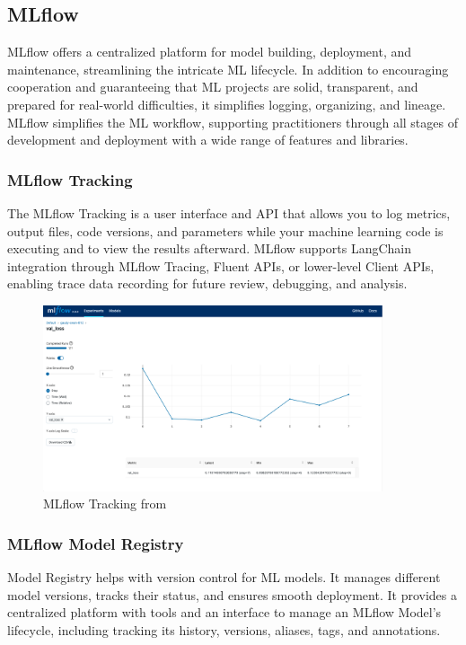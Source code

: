     \subsection{MLflow}
    MLflow offers a centralized platform for model building, deployment, and maintenance, streamlining the intricate ML lifecycle.  In addition to encouraging cooperation and guaranteeing that ML projects are solid, transparent, and prepared for real-world difficulties, it simplifies logging, organizing, and lineage. MLflow simplifies the ML workflow, supporting practitioners through all stages of development and deployment with a wide range of features and libraries.
    \cite{mlflow}
        \subsubsection{MLflow Tracking}
        The MLflow Tracking is a user interface and API that allows you to log metrics, output files, code versions, and parameters while your machine learning code is executing and to view the results afterward. MLflow supports LangChain integration through MLflow Tracing, Fluent APIs, or lower-level Client APIs, enabling trace data recording for future review, debugging, and analysis.
        \begin{figure}[H]
            \centering
            \includegraphics[width=10cm]{chapters/2/figures/mlflow-tracking-metrics-ui.png}
            \caption[MLflow Tracking]{MLflow Tracking  from~\cite{mlflow}}
            \label{fig:mlflow-tracking-metrics-ui}
        \end{figure}
        \subsubsection{MLflow Model Registry}
        Model Registry helps with version control for ML models. It manages different model versions, tracks their status, and ensures smooth deployment. It provides a centralized platform with tools and an interface to manage an MLflow Model's lifecycle, including tracking its history, versions, aliases, tags, and annotations.
